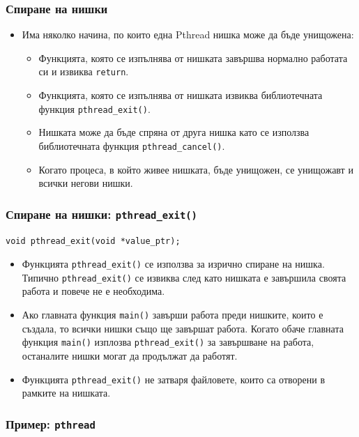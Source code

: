 \documentclass[ignorenonframetext, hyperref=unicode]{beamer}
\begin{document}
\begin{frame}[containsverbatim]
\frametitle{Спиране на нишки}
\begin{itemize}
\item Има няколко начина, по които една Pthread нишка може да бъде унищожена:
\begin{itemize}
  \item Функцията, която се изпълнява от нишката завършва нормално работата си и
  извиква \lstinline{return}.
  \item Функцията, която се изпълнява от нишката извиква библиотечната функция
  \lstinline{pthread_exit()}.
  \item Нишката може да бъде спряна от друга нишка като се използва
  библиотечната функция \lstinline{pthread_cancel()}.
  \item Когато процеса, в който живее нишката, бъде унищожен, се унищожавт и
  всички негови нишки.
\end{itemize}
\end{itemize}
\end{frame}

\begin{frame}[containsverbatim]
\frametitle{Спиране на нишки: \lstinline{pthread_exit()}}
\begin{lstlisting}[numbers=none]
void pthread_exit(void *value_ptr);
\end{lstlisting}
\begin{itemize}
\item Функцията \lstinline{pthread_exit()} се използва за изрично спиране на
нишка. Типично \lstinline{pthread_exit()} се извиква след като нишката е
завършила своята работа и повече не е необходима.
\item Ако главната функция \lstinline{main()} завърши работа преди нишките,
които е създала, то всички нишки също ще завършат работа. Когато обаче главната
функция \lstinline{main()} изплозва \lstinline{pthread_exit()} за завършване на
работа, останалите нишки могат да продължат да работят.
\item Функцията \lstinline{pthread_exit()} не затваря файловете, които са
отворени в рамките на нишката.
\end{itemize}
\end{frame}

\begin{frame}[containsverbatim]
\frametitle{Пример: \lstinline{pthread}}

\end{frame}
\end{document}
